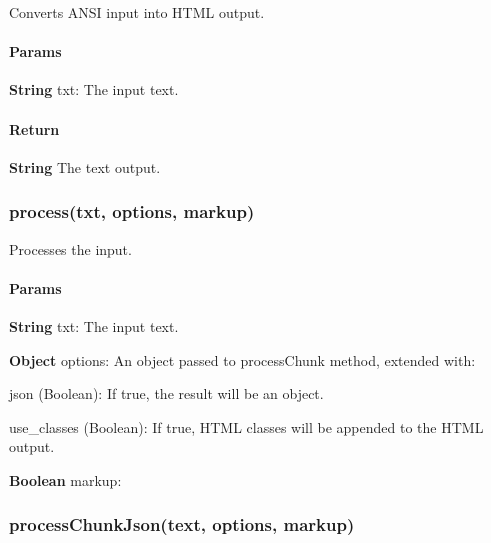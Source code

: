 Converts A\+N\+SI input into H\+T\+ML output. \paragraph*{Params}


\begin{DoxyItemize}
\item {\bfseries String} {\ttfamily txt}\+: The input text.
\end{DoxyItemize}

\paragraph*{Return}


\begin{DoxyItemize}
\item {\bfseries String} The text output.
\end{DoxyItemize}

\subsubsection*{{\ttfamily process(txt, options, markup)}}

Processes the input. \paragraph*{Params}


\begin{DoxyItemize}
\item {\bfseries String} {\ttfamily txt}\+: The input text.
\item {\bfseries Object} {\ttfamily options}\+: An object passed to {\ttfamily process\+Chunk} method, extended with\+:
\begin{DoxyItemize}
\item {\ttfamily json} (Boolean)\+: If {\ttfamily true}, the result will be an object.
\item {\ttfamily use\+\_\+classes} (Boolean)\+: If {\ttfamily true}, H\+T\+ML classes will be appended to the H\+T\+ML output.
\end{DoxyItemize}
\item {\bfseries Boolean} {\ttfamily markup}\+:
\end{DoxyItemize}

\subsubsection*{{\ttfamily process\+Chunk\+Json(text, options, markup)}}

